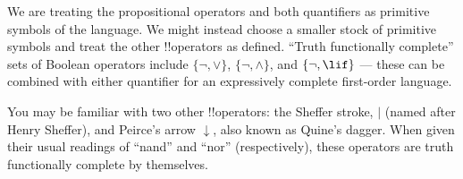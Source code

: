 \documentclass[../../include/open-logic-section]{subfiles}
\begin{document}
\begin{explain}
We are treating the propositional operators and both quantifiers as
primitive symbols of the language. We might instead choose a smaller
stock of primitive symbols and treat the other !!{operator}s as
defined. ``Truth functionally complete'' sets of Boolean operators
include $\{ \lnot, \lor \}$, $\{ \lnot, \land \}$, and $\{ \lnot,
\lif\}$ --- these can be combined with either quantifier for an
expressively complete first-order language.

You may be familiar with two other !!{operator}s: the Sheffer
stroke, $|$ (named after Henry Sheffer), and Peirce's arrow
$\downarrow$, also known as Quine's dagger. When given their usual
readings of ``nand'' and ``nor'' (respectively), these operators are
truth functionally complete by themselves.
\end{explain}
\end{document}
